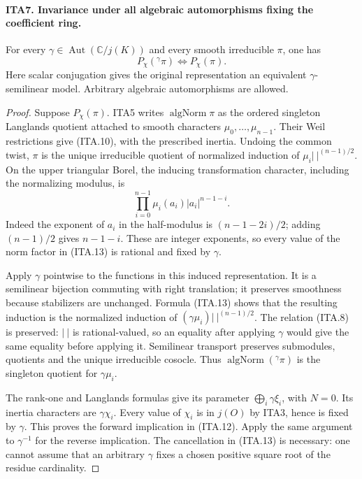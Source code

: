 \paragraph{ITA7. Invariance under all algebraic automorphisms fixing the coefficient ring.}
\label{claim:ITA7}
For every $\gamma\in\operatorname{Aut}(\mathbb C/j(K))$
and every smooth irreducible $\pi$, one has
\[
                        P_\chi({}^{\gamma}\pi)
                              \Longleftrightarrow P_\chi(\pi).
                                                               \tag{ITA.12}
\]
Here scalar conjugation gives the original representation an
equivalent $\gamma$-semilinear model.  Arbitrary algebraic
automorphisms are allowed.
\begin{proof}
Suppose $P_\chi(\pi)$.  ITA5 writes
$\operatorname{algNorm}\pi$ as the ordered singleton
Langlands quotient attached to smooth characters
$\mu_0,\ldots,\mu_{n-1}$.  Their Weil restrictions
give (ITA.10), with the prescribed inertia.
Undoing the common twist, $\pi$ is the unique irreducible
quotient of normalized induction of
$\mu_i|\ |^{(n-1)/2}$.  On the upper triangular Borel,
the inducing transformation character, including the
normalizing modulus, is
\[
       \prod_{i=0}^{n-1}\mu_i(a_i)|a_i|^{n-1-i}.
                                                               \tag{ITA.13}
\]
Indeed the exponent of $a_i$ in the half-modulus is
$(n-1-2i)/2$; adding $(n-1)/2$ gives $n-1-i$.
These are integer exponents, so every value of the norm
factor in (ITA.13) is rational and fixed by $\gamma$.

Apply $\gamma$ pointwise to the functions in this induced
representation.  It is a semilinear bijection commuting
with right translation; it preserves smoothness because
stabilizers are unchanged.  Formula (ITA.13) shows that
the resulting induction is the normalized induction of
$(\gamma\mu_i)|\ |^{(n-1)/2}$.  The relation (ITA.8)
is preserved: $|\ |$ is rational-valued, so an equality
after applying $\gamma$ would give the same equality
before applying it.  Semilinear transport preserves
submodules, quotients and the unique irreducible cosocle.
Thus $\operatorname{algNorm}({}^{\gamma}\pi)$ is the
singleton quotient for $\gamma\mu_i$.

The rank-one and Langlands formulas give its parameter
$\bigoplus_i\gamma\xi_i$, with $N=0$.  Its inertia
characters are $\gamma\chi_i$.  Every value of $\chi_i$
is in $j(O)$ by ITA3, hence is fixed by $\gamma$.
This proves the forward implication in (ITA.12).
Apply the same argument to $\gamma^{-1}$ for the reverse
implication.  The cancellation in (ITA.13) is necessary:
one cannot assume that an arbitrary $\gamma$ fixes a
chosen positive square root of the residue cardinality.
\end{proof}

